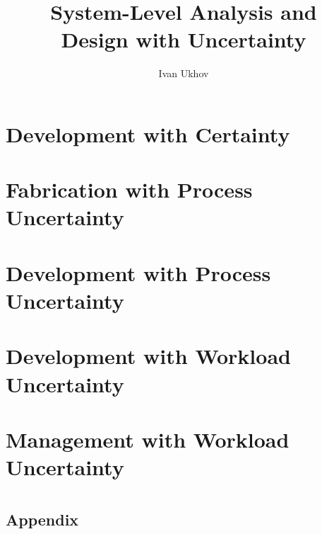 \documentclass{thesis}
\title{
  System-Level Analysis and\\[0.3em]
  Design with Uncertainty
}
\author{Ivan Ukhov}
\begin{document}
\nocite{
  ukhov2012,
  ukhov2014a,
  ukhov2014b,
  ukhov2015,
  ukhov2017a,
  ukhov2017b,
  ukhov2017c,
}

\chapter{\introductiontitle}
\glsresetall
\newcommand{\inputsection}[1]{}


\chapter{Development with Certainty}
\glsresetall
\renewcommand{\inputsection}[1]{}


\chapter{Fabrication with Process Uncertainty}
\glsresetall
\renewcommand{\inputsection}[1]{}


\chapter{Development with Process Uncertainty}
\glsresetall
\renewcommand{\inputsection}[1]{}


\chapter{Development with Workload Uncertainty}
\glsresetall
\renewcommand{\inputsection}[1]{}


\chapter{Management with Workload Uncertainty}
\glsresetall
\renewcommand{\inputsection}[1]{}


\chapter{\conclusiontitle}
\glsresetall


\begin{appendices}
\chapter{Appendix}
\glsresetall
\renewcommand{\inputsection}[1]{}

\end{appendices}

\printbibliography
\end{document}
